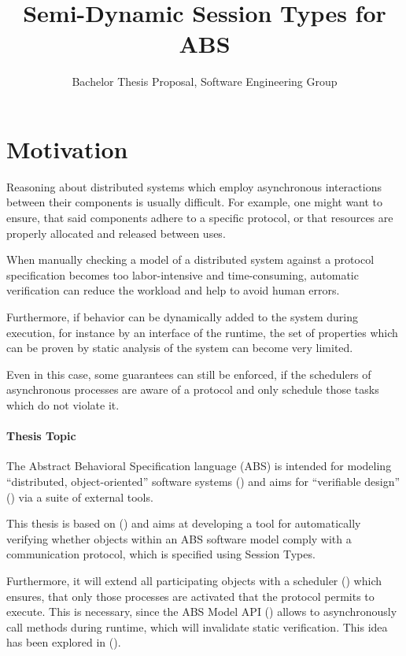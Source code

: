 \documentclass[paper=a4,nochapname,accentcolor=tud9c]{tudexercise}
\title{Semi-Dynamic Session Types for ABS}
\subtitle{Bachelor Thesis Proposal, Software Engineering Group}
\newcommand\textcitep[1]{\mkbibparens{\textcite{#1}}}
\newcommand\textcitesp[1]{\mkbibparens{\textcites{#1}}}
\begin{document}
%
\maketitle
%
\tableofcontents

\section{Motivation}
Reasoning about distributed systems which employ asynchronous interactions between their
components is usually difficult.
For example, one might want to ensure, that said components adhere to a specific
protocol, or that resources are properly allocated and released between uses.

When manually checking a model of a distributed system against a protocol
specification becomes too labor-intensive and time-consuming, automatic verification
can reduce the workload and help to avoid human errors.

Furthermore, if behavior can be dynamically added to the system during execution,
for instance by an interface of the runtime, the set of properties which
can be proven by static analysis of the system can become very limited.

Even in this case, some guarantees can still be enforced, if the schedulers of
asynchronous processes are aware of a protocol and only schedule those tasks
which do not violate it.

\paragraph{Thesis Topic}

The Abstract Behavioral Specification language (ABS) is intended for modeling
``distributed, object-oriented'' software systems \textcitep{johnsen2010abs} and
aims for ``verifiable design'' \textcitep{hahnle2012abstract} via a suite of external tools.

This thesis is based on %
\textcitesp{kamburjan2018stateful, kamburjan2016session} and
aims at developing a tool for automatically verifying whether objects within an
ABS software model comply with a communication protocol, which is specified
using Session Types.

Furthermore, it will extend all participating objects with a scheduler \textcitep{bjork2013user} which
ensures, that only those processes are activated that the protocol permits to execute.
This is necessary, since the ABS Model API \textcitep{schlatte2018release} allows to asynchronously call methods during
runtime, which will invalidate static verification.
This idea has been explored in \textcitep{kamburjan2016session}.
\end{document}
